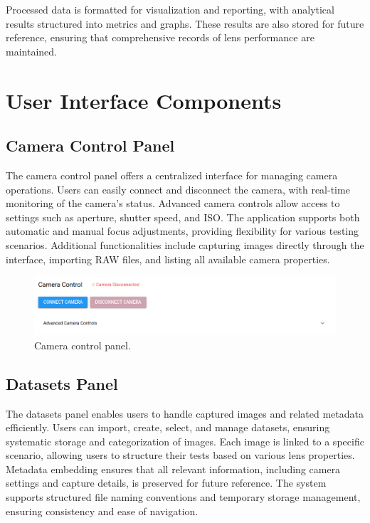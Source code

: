 Processed data is formatted for visualization and reporting, with analytical results structured into metrics and graphs. These results are also stored for future reference, ensuring that comprehensive records of lens performance are maintained.

\section{User Interface Components}

\subsection{Camera Control Panel}

The camera control panel offers a centralized interface for managing camera operations. Users can easily connect and disconnect the camera, with real-time monitoring of the camera’s status. Advanced camera controls allow access to settings such as aperture, shutter speed, and ISO. The application supports both automatic and manual focus adjustments, providing flexibility for various testing scenarios. Additional functionalities include capturing images directly through the interface, importing RAW files, and listing all available camera properties.

\begin{figure}[h]
\centering
\includegraphics[width=1\textwidth]{Images/camera_control.png}
\caption{Camera control panel.}
\label{fig:ui_camera_control}
\end{figure}

\subsection{Datasets Panel}

The datasets panel enables users to handle captured images and related metadata efficiently. Users can import, create, select, and manage datasets, ensuring systematic storage and categorization of images. Each image is linked to a specific scenario, allowing users to structure their tests based on various lens properties. Metadata embedding ensures that all relevant information, including camera settings and capture details, is preserved for future reference. The system supports structured file naming conventions and temporary storage management, ensuring consistency and ease of navigation.

